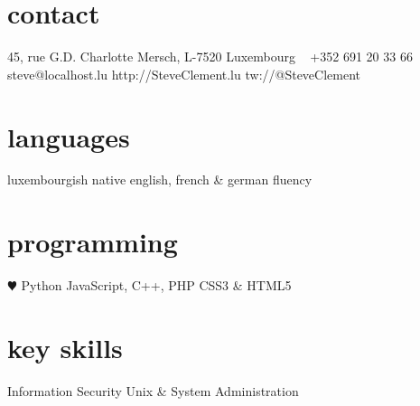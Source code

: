 \documentclass[]{friggeri-cv} %
\begin{document}


\begin{aside} %
\section{contact}
45, rue G.D. Charlotte
Mersch, L-7520
Luxembourg
~
+352 691 20 33 66
~
{steve@localhost.lu}
{http://SteveClement.lu}
{tw://@SteveClement}
\section{languages}
luxembourgish native
english, french \& german fluency
\section{programming}
{\color{red} $\varheartsuit$} Python
JavaScript, C++, PHP
CSS3 \& HTML5
\section{key skills}
Information Security
Unix \& System Administration
\end{aside}

\end{document}
